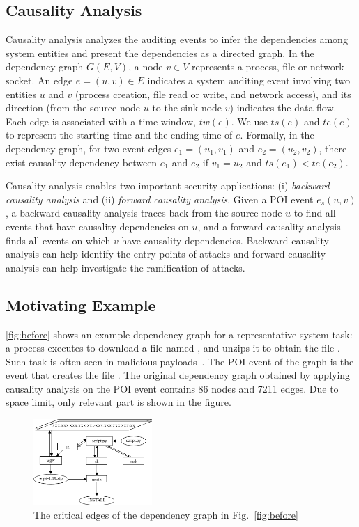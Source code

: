 \subsection{Causality Analysis}
Causality analysis analyzes the auditing events to infer the dependencies among system entities and present the dependencies as a directed graph.
In the dependency graph $G(E,V)$, a node $v \in V$ represents a process, file or network socket.
An edge $e = (u, v) \in E$ indicates a system auditing event involving two entities $u$ and $v$ (\eg process creation, file read or write, and network access), and its direction (from the source node $u$ to the sink node $v$) indicates the data flow.
Each edge is associated with a time window, $tw(e)$.
We use $ts(e)$ and $te(e)$ to represent the starting time and the ending time of $e$.
Formally, in the dependency graph, for two event edges $e_1 = (u_1, v_1) $ and $e_2 = (u_2, v_2)$, there exist causality dependency between $e_1$ and $e_2$ if $v_1 = u_2$ and $ts(e_1) < te(e_2)$.

Causality analysis enables two important security applications:
(i) \emph{backward causality analysis} and (ii) \emph{forward causality analysis}.
Given a POI event $e_s(u,v)$, a backward causality analysis traces back from the source node $u$ to find all events that have causality dependencies on $u$,
and a forward causality analysis finds all events on which $v$ have causality dependencies.
Backward causality analysis can help identify the entry points of attacks 
and forward causality analysis can help investigate the ramification of attacks.


\subsection{Motivating Example}
\cref{fig:before} shows an example dependency graph for a representative system task:
a process  executes  to download a file named , and unzips it to obtain the file .
Such task is often seen in malicious payloads~\cite{securitybook}.
The POI event of the graph is the event that creates the file .
The original dependency graph obtained by applying causality analysis on the POI event contains 86 nodes and 7211 edges.
Due to space limit, only relevant part is shown in the figure.

\begin{figure}
    \centering
    \includegraphics[width=0.4\textwidth]{figs/fig-after.png}
    \caption{The critical edges of the dependency graph in Fig.~\ref{fig:before}}
    \label{fig:after}
\end{figure}

